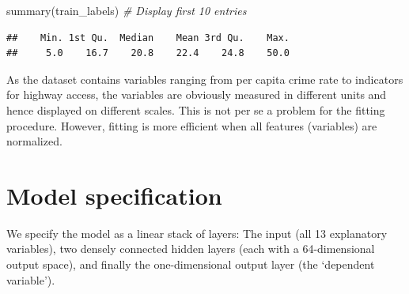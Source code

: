 \documentclass[
  12pt,
]{style/krantz}
\newenvironment{Shaded}{\begin{snugshade}}{\end{snugshade}}
\newcommand{\AttributeTok}[1]{\textcolor[rgb]{0.77,0.63,0.00}{#1}}
\newcommand{\CommentTok}[1]{\textcolor[rgb]{0.56,0.35,0.01}{\textit{#1}}}
\newcommand{\FunctionTok}[1]{\textcolor[rgb]{0.00,0.00,0.00}{#1}}
\newcommand{\NormalTok}[1]{#1}
\newcommand{\OtherTok}[1]{\textcolor[rgb]{0.56,0.35,0.01}{#1}}
\newcommand{\SpecialCharTok}[1]{\textcolor[rgb]{0.00,0.00,0.00}{#1}}
\begin{document}
\begin{Shaded}
\begin{Highlighting}[]
\FunctionTok{summary}\NormalTok{(train\_labels) }\CommentTok{\# Display first 10 entries}
\end{Highlighting}
\end{Shaded}

\begin{verbatim}
##    Min. 1st Qu.  Median    Mean 3rd Qu.    Max. 
##     5.0    16.7    20.8    22.4    24.8    50.0
\end{verbatim}

As the dataset contains variables ranging from per capita crime rate to indicators for highway access, the variables are obviously measured in different units and hence displayed on different scales. This is not per se a problem for the fitting procedure. However, fitting is more efficient when all features (variables) are normalized.

\begin{Shaded}
\end{Shaded}

\hypertarget{model-specification}{%
\section{Model specification}\label{model-specification}}

We specify the model as a linear stack of layers: The input (all 13 explanatory variables), two densely connected hidden layers (each with a 64-dimensional output space), and finally the one-dimensional output layer (the `dependent variable').
\end{document}
